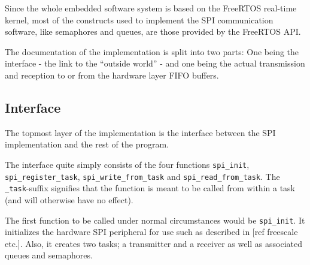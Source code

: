 Since the whole embedded software system is based on the FreeRTOS real-time kernel, most of the constructs used to implement the SPI communication software, like semaphores and queues, are those provided by the FreeRTOS API.

The documentation of the implementation is split into two parts: One being the interface - the link to the ``outside world'' - and one being the actual transmission and reception to or from the hardware layer FIFO buffers.



\subsection{Interface}
The topmost layer of the implementation is the interface between the SPI implementation and the rest of the program.

The interface quite simply consists of the four functions \texttt{spi\_init}, \texttt{spi\_register\_task}, \texttt{spi\_write\_from\_task} and \texttt{spi\_read\_from\_task}. The \texttt{\_task}-suffix signifies that the function is meant to be called from within a task (and will otherwise have no effect).

The first function to be called under normal circumstances would be \texttt{spi\_init}. It initializes the hardware SPI peripheral for use such as described in [ref freescale etc.]. Also, it creates two tasks; a transmitter and a receiver as well as associated queues and semaphores.

